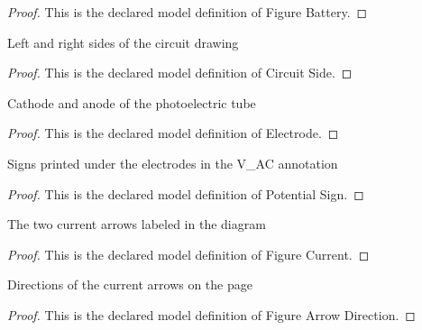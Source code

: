 \begin{proof}
  This is the declared model definition of Figure Battery.
\end{proof}
\begin{definition}
  \label{def:physics:phyx-mini-0612:phyxminiproblems-problemphyxmini0612-circuitside}
  Left and right sides of the circuit drawing
\end{definition}
\begin{proof}
  This is the declared model definition of Circuit Side.
\end{proof}
\begin{definition}[Electrode]
  \label{def:physics:phyx-mini-0612:phyxminiproblems-problemphyxmini0612-electrode}
  Cathode and anode of the photoelectric tube
\end{definition}
\begin{proof}
  This is the declared model definition of Electrode.
\end{proof}
\begin{definition}
  \label{def:physics:phyx-mini-0612:phyxminiproblems-problemphyxmini0612-potentialsign}
  Signs printed under the electrodes in the V\_AC annotation
\end{definition}
\begin{proof}
  This is the declared model definition of Potential Sign.
\end{proof}
\begin{definition}
  \label{def:physics:phyx-mini-0612:phyxminiproblems-problemphyxmini0612-figurecurrent}
  The two current arrows labeled in the diagram
\end{definition}
\begin{proof}
  This is the declared model definition of Figure Current.
\end{proof}
\begin{definition}
  \label{def:physics:phyx-mini-0612:phyxminiproblems-problemphyxmini0612-figurearrowdirection}
  Directions of the current arrows on the page
\end{definition}
\begin{proof}
  This is the declared model definition of Figure Arrow Direction.
\end{proof}
